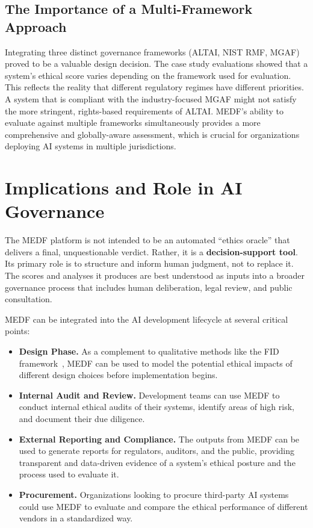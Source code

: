 \subsection{The Importance of a Multi-Framework Approach}

Integrating three distinct governance frameworks (ALTAI, NIST RMF, MGAF) proved to be a valuable design decision. The case study evaluations showed that a system's ethical score varies depending on the framework used for evaluation. This reflects the reality that different regulatory regimes have different priorities. A system that is compliant with the industry-focused MGAF might not satisfy the more stringent, rights-based requirements of ALTAI. MEDF's ability to evaluate against multiple frameworks simultaneously provides a more comprehensive and globally-aware assessment, which is crucial for organizations deploying AI systems in multiple jurisdictions.

\section{Implications and Role in AI Governance}
\label{sec:implications}

The MEDF platform is not intended to be an automated \enquote{ethics oracle} that delivers a final, unquestionable verdict. Rather, it is a \textbf{decision-support tool}. Its primary role is to structure and inform human judgment, not to replace it. The scores and analyses it produces are best understood as inputs into a broader governance process that includes human deliberation, legal review, and public consultation.

MEDF can be integrated into the AI development lifecycle at several critical points:

\begin{itemize}[leftmargin=2em]
  \item \textbf{Design Phase.} As a complement to qualitative methods like the FID framework~\cite{zhang2023fairness}, MEDF can be used to model the potential ethical impacts of different design choices before implementation begins.

  \item \textbf{Internal Audit and Review.} Development teams can use MEDF to conduct internal ethical audits of their systems, identify areas of high risk, and document their due diligence.

  \item \textbf{External Reporting and Compliance.} The outputs from MEDF can be used to generate reports for regulators, auditors, and the public, providing transparent and data-driven evidence of a system's ethical posture and the process used to evaluate it.

  \item \textbf{Procurement.} Organizations looking to procure third-party AI systems could use MEDF to evaluate and compare the ethical performance of different vendors in a standardized way.
\end{itemize}

